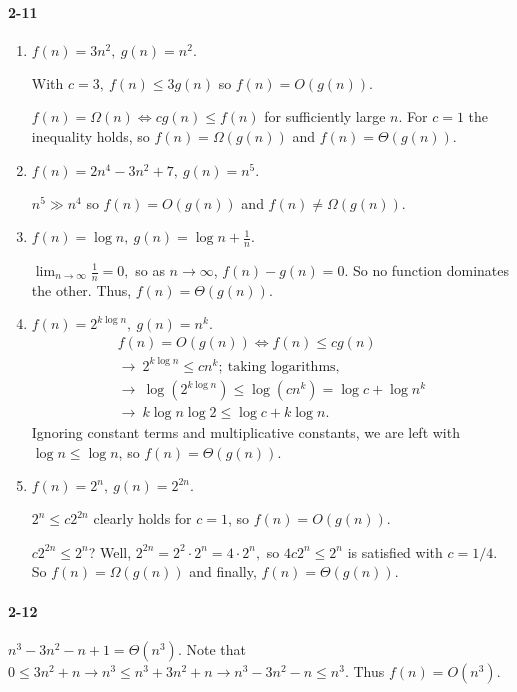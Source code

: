 \documentclass{report}
\begin{document}
\paragraph{2-11}
\begin{enumerate}[label=(\alph*)]
	\item $f(n) = 3n^2,\ g(n) = n^2.$

		With $c = 3,\ f(n) \le 3g(n)$ so $f(n) = O(g(n)).$

		$f(n) = \Omega(n) \iff cg(n) \le f(n)$ for sufficiently large $n$. For $c = 1$ the inequality holds, so $f(n) = \Omega(g(n))$ and $f(n) = \Theta(g(n)).$

	\item $f(n) = 2n^4 - 3n^2 + 7,\ g(n) = n^5.$

		$n^5 \gg n^4$ so $f(n) = O(g(n))$ and $f(n) \ne \Omega(g(n)).$

	\item $f(n) = \log n,\ g(n) = \log n + \frac{1}{n}.$

		$\lim_{n\to\infty} \frac{1}{n} = 0,$ so as $n\to\infty$, $f(n) - g(n) = 0$. So no function dominates the other. Thus, $f(n) = \Theta(g(n)).$

	\item $f(n) = 2^{k\log n},\ g(n) = n^k.$
		\begin{gather*}
			f(n) = O(g(n)) \iff f(n) \le cg(n) \\
			\to\ 2^{k\log n} \le cn^k;\ \text{taking logarithms,} \\
			\to\ \log\left(2^{k\log n}\right) \le \log\left(cn^k\right)
				= \log c + \log n^k \\
			\to\ k\log n\log 2 \le \log c + k\log n.
		\end{gather*}
		Ignoring constant terms and multiplicative constants, we are left with
		$\log n \le \log n$, so $f(n) = \Theta(g(n)).$

	\item $f(n) = 2^n,\ g(n) = 2^{2n}.$

		$2^n \le c2^{2n}$ clearly holds for $c = 1$, so $f(n) = O(g(n)).$

		$c2^{2n} \le 2^n$? Well, $2^{2n} = 2^2\cdot2^n = 4\cdot2^n,$ so $4c2^n \le 2^n$ is satisfied with $c = 1/4.$ So $f(n) = \Omega(g(n))$ and finally, $f(n) = \Theta(g(n)).$
\end{enumerate}

\paragraph{2-12}$n^3 - 3n^2 -n + 1 = \Theta(n^3).$ Note that $0 \le 3n^2 + n \to n^3 \le n^3 + 3n^2 + n \to n^3 - 3n^2 - n \le n^3$. Thus $f(n) = O(n^3)$.
\end{document}
